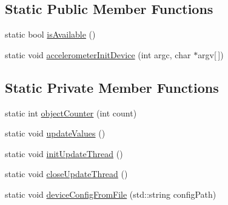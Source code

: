 \subsection*{Static Public Member Functions}
\begin{DoxyCompactItemize}
\item 
static bool \hyperlink{classAccelerometer_a47ffdc4ab4b99fd0339f964e8a4325f1}{is\+Available} ()
\item 
static void \hyperlink{classAccelerometer_a148aaf7f305b2085c5eacf672007d126}{accelerometer\+Init\+Device} (int argc, char $\ast$argv\mbox{[}$\,$\mbox{]})
\end{DoxyCompactItemize}
\subsection*{Static Private Member Functions}
\begin{DoxyCompactItemize}
\item 
static int \hyperlink{classAccelerometer_ab237ee2d54f41bf5b9cdd1b2d0e30da2}{object\+Counter} (int count)
\item 
static void \hyperlink{classAccelerometer_a0ef1257304190883a415bd1c5d6e2b13}{update\+Values} ()
\item 
static void \hyperlink{classAccelerometer_ae79d97fb2ca83127b10ca309b0732cba}{init\+Update\+Thread} ()
\item 
static void \hyperlink{classAccelerometer_ab8a7687fc06b233e12368b04ec402357}{close\+Update\+Thread} ()
\item 
static void \hyperlink{classAccelerometer_aad6765aee0dbea85d3b5d3fa74a2992c}{device\+Config\+From\+File} (std\+::string config\+Path)
\end{DoxyCompactItemize}
